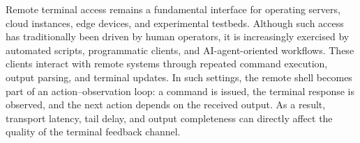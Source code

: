 


    
    



Remote terminal access remains a fundamental interface for
operating servers, cloud instances, edge devices, and experimental testbeds. Although such access has traditionally been driven by human operators, it is increasingly exercised by automated scripts, programmatic clients, and AI-agent-oriented workflows. These clients interact with remote systems through repeated command execution, output parsing, and terminal updates. In such settings, the remote shell becomes part of an action--observation loop: a command is issued, the terminal response is observed, and the next action depends on the received output. As a result, transport latency, tail delay, and output completeness can directly affect the
quality of the terminal feedback channel.

